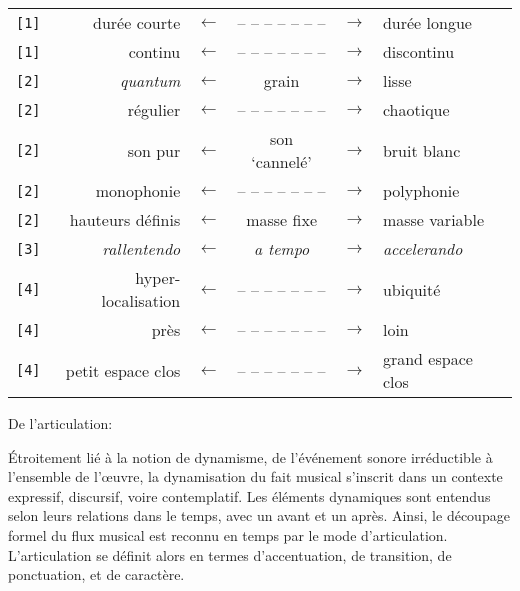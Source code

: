 \documentclass{article}
\begin{document}
\begin{longtable}{lrcccl}
\texttt{[1]} & durée courte & $\leftarrow$ & -- -- -- -- -- -- -- & $\rightarrow$ & durée longue \\
\texttt{[1]} & continu & $\leftarrow$ & -- -- -- -- -- -- -- & $\rightarrow$ & discontinu \\
\texttt{[2]} & \textit{quantum} & $\leftarrow$ & grain & $\rightarrow$ & lisse \\
\texttt{[2]} & régulier & $\leftarrow$ & -- -- -- -- -- -- -- & $\rightarrow$ & chaotique \\
\texttt{[2]} & son pur & $\leftarrow$ & son `cannelé' & $\rightarrow$ & bruit blanc \\
\texttt{[2]} & monophonie & $\leftarrow$ & -- -- -- -- -- -- -- & $\rightarrow$ & polyphonie \\
\texttt{[2]} & hauteurs définis & $\leftarrow$ & masse fixe & $\rightarrow$ & masse variable \\
\texttt{[3]} & \textit{rallentendo} & $\leftarrow$ & \textit{a tempo} & $\rightarrow$ & \textit{accelerando} \\
\texttt{[4]} & hyper-localisation & $\leftarrow$ & -- -- -- -- -- -- -- & $\rightarrow$ & ubiquité \\
\texttt{[4]} & près & $\leftarrow$ & -- -- -- -- -- -- -- & $\rightarrow$ & loin \\
\texttt{[4]} & petit espace clos & $\leftarrow$ & -- -- -- -- -- -- -- & $\rightarrow$ & grand espace clos \\
\end{longtable}



\bigskip

De l'articulation:

\smallskip

\noindent Étroitement lié à la notion de dynamisme, 
de l'événement sonore irréductible à l'ensemble de l'œuvre,
la dynamisation du fait musical
s'inscrit dans un contexte expressif, discursif, voire
 contemplatif. 
 Les éléments dynamiques sont entendus selon leurs relations dans le temps, avec un avant et un après.
Ainsi, le découpage formel du flux musical est reconnu en temps par le mode d’articulation.
L'articulation se définit alors en termes d'accentuation, de transition, de ponctuation, et de caractère.
\end{document}
